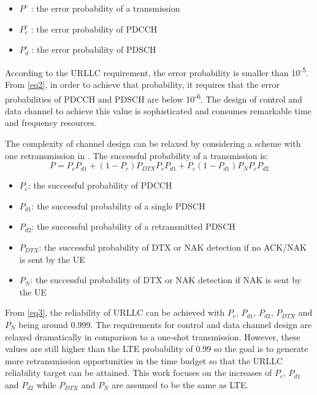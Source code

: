 \documentclass[conference]{IEEEtran}
\begin{document}
\begin{itemize}
    \item $P^{e}$ : the error probability of a transmission
    \item $P^{e}_{c}$ : the error probability of PDCCH 
    \item $P^{e}_{d}$ : the error probability of PDSCH
\end{itemize}

According to the URLLC requirement, the error probability is smaller than 10\textsuperscript{-5}. From \eqref{eq2}, in order to achieve that probability, it requires that the error probabilities of PDCCH and PDSCH are below 10\textsuperscript{-6}. The design of control and data channel to achieve this value is sophisticated and consumes remarkable time and frequency resources.

The complexity of channel design can be relaxed by considering a scheme with one retransmission in \cite{b7}. The successful probability of a transmission is:
\begin{equation}
P = P_{c}P_{d1} + (1-P_{c})P_{DTX}P_{c}P_{d1} + P_{c}(1-P_{d1})P_{N}P_{c}P_{d2}\label{eq3}
\end{equation}
\begin{itemize}
    \item $P_{c}$: the successful probability of PDCCH
    \item $P_{d1}$: the successful probability of a single PDSCH
    \item $P_{d2}$: the successful probability of a retransmitted PDSCH
    \item $P_{DTX}$: the successful probability of DTX or NAK detection if no ACK/NAK is sent by the UE
    \item $P_{N}$: the successful probability of DTX or NAK detection if NAK is sent by the UE
\end{itemize}

From \eqref{eq3}, the reliability of URLLC can be achieved with $P_{c}$, $P_{d1}$, $P_{d2}$, $P_{DTX}$ and $P_{N}$ being around 0.999. The requirements for control and data channel design are relaxed dramatically in comparison to a one-shot transmission. However, these values are still higher than the LTE probability of 0.99 so the goal is to generate more retransmission opportunities in the time budget  so  that  the  URLLC  reliability  target  can be attained. This work focuses on the increases of $P_{c}$, $P_{d1}$ and $P_{d2}$ while $P_{DTX}$ and $P_{N}$ are assumed to be the same as LTE.
\end{document}
